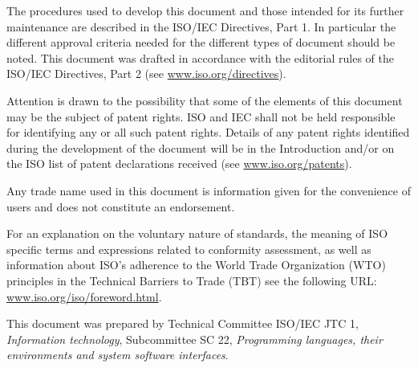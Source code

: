 The procedures used to develop this document and those intended for its further
maintenance are described in the ISO/IEC Directives, Part 1.  In particular the
different approval criteria needed for the different types of document should be
noted.  This document was drafted in accordance with the editorial rules of the
ISO/IEC Directives, Part 2 (see \url{www.iso.org/directives}).

Attention is drawn to the possibility that some of the elements of this document
may be the subject of patent rights. ISO and IEC shall not be held responsible
for identifying any or all such patent rights.  Details of any patent rights
identified during the development of the document will be in the Introduction
and/or on the ISO list of patent declarations received (see \url{www.iso.org/patents}).

Any trade name used in this document is information given for the convenience of
users and does not constitute an endorsement.

For an explanation on the voluntary nature of standards, the meaning of ISO
specific terms and expressions related to conformity assessment, as well as
information about ISO's adherence to the World Trade Organization (WTO) principles
in the Technical Barriers to Trade (TBT) see the following URL:
\url{www.iso.org/iso/foreword.html}.

This document was prepared by Technical Committee ISO/IEC JTC 1, \emph{Information
technology}, Subcommittee SC 22, \emph{Programming languages, their environments and
system software interfaces}.

\newpage
